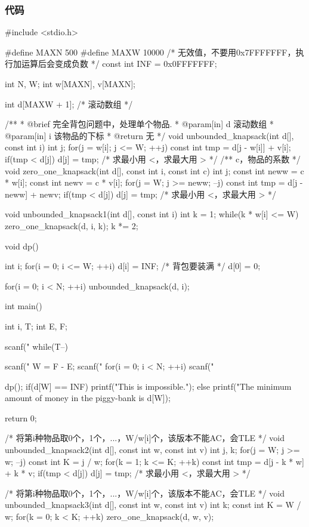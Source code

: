 \subsubsection{代码}
\begin{Codex}[label=piggy_bank.c]
#include <stdio.h>

#define MAXN 500
#define MAXW 10000
 /* 无效值，不要用0x7FFFFFFF，执行加运算后会变成负数 */
const int INF = 0x0FFFFFFF;

int N, W;
int w[MAXN], v[MAXN];

int d[MAXW + 1]; /* 滚动数组 */

/**
 * @brief 完全背包问题中，处理单个物品.
 * @param[in] d 滚动数组
 * @param[in] i 该物品的下标
 * @return 无
 */
void unbounded_knapsack(int d[], const int i) {
    int j;
    for(j = w[i]; j <= W; ++j) {
        const int tmp = d[j - w[i]] + v[i];
        if(tmp < d[j]) d[j] = tmp; /* 求最小用 <，求最大用 > */
    }
}
/** c，物品的系数 */
void zero_one_knapsack(int d[], const int i, const int c) {
    int j;
    const int neww = c * w[i];
    const int newv = c * v[i];
    for(j = W; j >= neww; --j) {
        const int tmp = d[j - neww] + newv;
        if(tmp < d[j]) d[j] = tmp;  /* 求最小用 <，求最大用 > */
    }
}

void unbounded_knapsack1(int d[], const int i) {
    int k = 1;
    while(k * w[i] <= W) {
        zero_one_knapsack(d, i, k);
        k *= 2;
    }
}

void dp() {
    int i;
    for(i = 0; i <= W; ++i) d[i] = INF; /* 背包要装满 */
    d[0] = 0;

    for(i = 0; i < N; ++i) unbounded_knapsack(d, i);
}

int main() {    
    int i, T;
    int E, F;
 
    scanf("%
    while(T--) {
        scanf("%
        W = F - E;
        scanf("%
        for(i = 0; i < N; ++i) scanf("%

        dp();
        if(d[W] == INF) {
            printf("This is impossible.\n");
        } else {
            printf("The minimum amount of money in the piggy-bank is %
                    d[W]);
        }
    }
    return 0;
}

/* 将第i种物品取0个，1个，...，W/w[i]个，该版本不能AC，会TLE */
void unbounded_knapsack2(int d[], const int w, const int v) {
    int j, k;
    for(j = W; j >= w; --j) {
        const int K = j / w;
        for(k = 1; k <= K; ++k) {
            const int tmp = d[j - k * w] + k * v;
            if(tmp < d[j]) d[j] = tmp; /* 求最小用 <，求最大用 > */
        }
    }
}

/* 将第i种物品取0个，1个，...，W/w[i]个，该版本不能AC，会TLE */
void unbounded_knapsack3(int d[], const int w, const int v) {
    int k;
    const int K = W / w;
    for(k = 0; k < K; ++k){
        zero_one_knapsack(d, w, v);
    }
}
\end{Codex}


